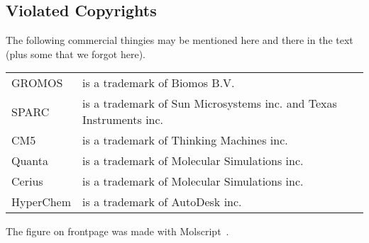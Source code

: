 \documentclass[11pt,dvips]{book}
\begin{document}
\subsection*{Violated Copyrights}
The following commercial thingies may be mentioned here and there in the
text (plus some that we forgot here).
\begin{table}[h]
\begin{tabularx}{\linewidth}{lX}
\hline
GROMOS    & is a trademark of Biomos B.V.\\
SPARC     & is a trademark of Sun Microsystems inc. and Texas Instruments inc.\\
CM5       & is a trademark of Thinking Machines inc.\\
Quanta    & is a trademark of Molecular Simulations inc.\\
Cerius    & is a trademark of Molecular Simulations inc.\\
HyperChem & is a trademark of AutoDesk inc.\\
\hline
\end{tabularx}
\end{table}

The figure on frontpage was made with Molscript~\cite{Kraulis91}.

%
%
\tableofcontents
\listoffigures
\listoftables

%
%
\newpage
\setcounter{page}{1}





%





%
%
\appendix





%
%



%
%
\printindex
\end{document}
